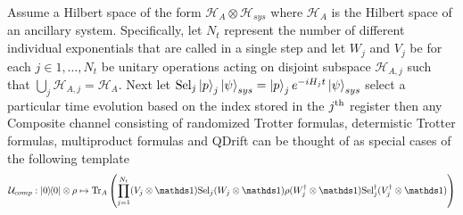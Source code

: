 \begin{claim}
Assume a Hilbert space of the form $\mathcal{H}_A \otimes \mathcal{H}_{sys}$ where $\mathcal{H}_A$ is the Hilbert space of an ancillary system.  Specifically, let $N_t$ represent the number of different individual exponentials that are called in a single step and let $W_j$ and $V_j $ be for each $j\in 1,\ldots, N_t$ be unitary operations acting on disjoint subspace $\mathcal{H}_{A,j}$ such that $\bigcup_j \mathcal{H}_{A,j} = \mathcal{H}_A$.  Next let ${\rm Sel}_j\ket{p}_j \ket{\psi}_{sys} = \ket{p}_j e^{-i H_j t} \ket{\psi}_{sys}$ select a particular time evolution based on the index stored in the $j^{\rm th}$ register then any Composite channel consisting of randomized Trotter formulas, determistic Trotter formulas, multiproduct formulas and QDrift can be thought of as special cases of the following template
$$
\capU_{comp} : \ketbra{0}{0}\otimes\rho \mapsto {\rm Tr}_{A} \left(\prod_{j=1}^{N_t} (V_j\otimes \openone) {\rm Sel}_j (W_j\otimes \openone) \rho (W_j^\dagger\otimes \openone){\rm Sel}_j^\dagger (V_j^\dagger\otimes \openone)\right)
$$
\end{claim}
